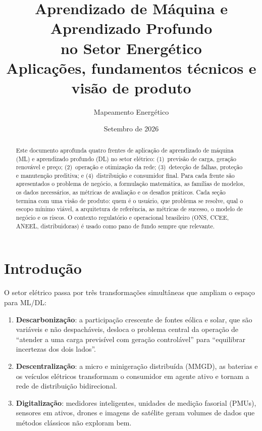 \documentclass[11pt,a4paper]{article}
\title{Aprendizado de Máquina e Aprendizado Profundo\\no Setor Energético\\[4pt]
\large Aplicações, fundamentos técnicos e visão de produto}
\author{Mapeamento Energético}
\date{Setembro de 2026}
\begin{document}
\maketitle

\begin{abstract}
Este documento aprofunda quatro frentes de aplicação de aprendizado de máquina
(ML) e aprendizado profundo (DL) no setor elétrico: (1)~previsão de carga,
geração renovável e preço; (2)~operação e otimização da rede;
(3)~detecção de falhas, proteção e manutenção preditiva; e (4)~distribuição e
consumidor final. Para cada frente são apresentados o problema de negócio, a
formulação matemática, as famílias de modelos, os dados necessários, as
métricas de avaliação e os desafios práticos. Cada seção termina com
uma visão de produto: quem é o usuário, que problema se resolve, qual o
escopo mínimo viável, a arquitetura de referência, as métricas de sucesso, o
modelo de negócio e os riscos. O contexto regulatório e operacional brasileiro
(ONS, CCEE, ANEEL, distribuidoras) é usado como pano de fundo sempre que
relevante.
\end{abstract}

\tableofcontents
\newpage

\section{Introdução}

O setor elétrico passa por três transformações simultâneas que ampliam o
espaço para ML/DL:

\begin{enumerate}
  \item \textbf{Descarbonização}: a participação crescente de fontes eólica e
    solar, que são variáveis e não despacháveis, desloca o problema central
    da operação de ``atender a uma carga previsível com geração controlável''
    para ``equilibrar incertezas dos dois lados''.
  \item \textbf{Descentralização}: a micro e minigeração distribuída (MMGD),
    as baterias e os veículos elétricos transformam o consumidor em agente
    ativo e tornam a rede de distribuição bidirecional.
  \item \textbf{Digitalização}: medidores inteligentes, unidades de medição
    fasorial (PMUs), sensores em ativos, drones e imagens de satélite geram
    volumes de dados que métodos clássicos não exploram bem.
\end{enumerate}
\end{document}
